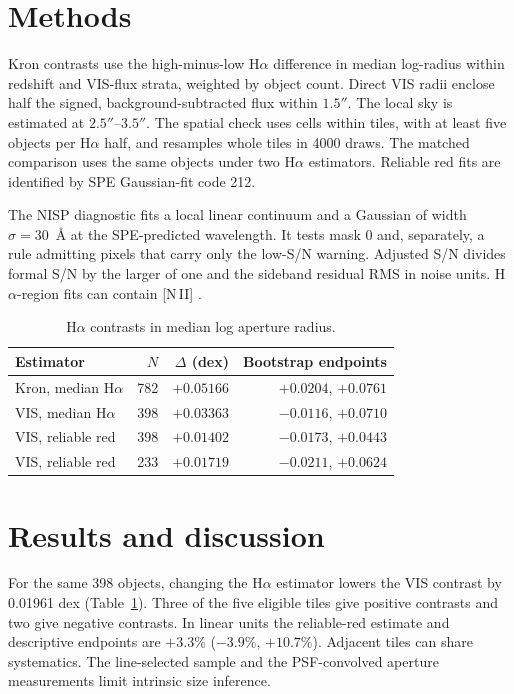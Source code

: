 \documentclass{aa}
\begin{document}
\section{Methods}
Kron contrasts use the high-minus-low H$\alpha$ difference in median log-radius within redshift and VIS-flux strata, weighted by object count. Direct VIS radii enclose half the signed, background-subtracted flux within $1.5''$. The local sky is estimated at $2.5''$--$3.5''$. The spatial check uses cells within tiles, with at least five objects per H$\alpha$ half, and resamples whole tiles in 4000 draws. The matched comparison uses the same objects under two H$\alpha$ estimators. Reliable red fits are identified by SPE Gaussian-fit code 212.

The NISP diagnostic fits a local linear continuum and a Gaussian of width $\sigma=30$~\AA{} at the SPE-predicted wavelength. It tests mask 0 and, separately, a rule admitting pixels that carry only the low-S/N warning. Adjusted S/N divides formal S/N by the larger of one and the sideband residual RMS in noise units. H$\alpha$-region fits can contain [N\,II] \citep{fumana2026,gabarra2026}.

\begin{table}[t]
\caption{H$\alpha$ contrasts in median log aperture radius.}
\label{tab:contrast}
\centering\small
\begin{tabular}{lrrr}
\hline\hline
Estimator & $N$ & $\Delta$ (dex) & Bootstrap endpoints\\
\hline
Kron, median H$\alpha$ &782&$+0.05166$&$+0.0204$, $+0.0761$\\
VIS, median H$\alpha$ &398&$+0.03363$&$-0.0116$, $+0.0710$\\
VIS, reliable red &398&$+0.01402$&$-0.0173$, $+0.0443$\\
VIS, reliable red &233&$+0.01719$&$-0.0211$, $+0.0624$\\
\hline
\end{tabular}
\end{table}

\section{Results and discussion}
For the same 398 objects, changing the H$\alpha$ estimator lowers the VIS contrast by 0.01961 dex (Table~\ref{tab:contrast}). Three of the five eligible tiles give positive contrasts and two give negative contrasts. In linear units the reliable-red estimate and descriptive endpoints are $+3.3\%$ ($-3.9\%$, $+10.7\%$). Adjacent tiles can share systematics. The line-selected sample and the PSF-convolved aperture measurements limit intrinsic size inference.
\end{document}
